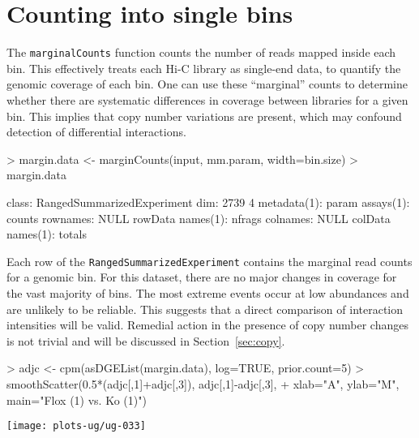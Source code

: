 \documentclass[12pt]{report}
\renewenvironment{Schunk}{\vspace{0pt}}{\vspace{0pt}}
\newcommand{\code}[1]{{\small\texttt{#1}}}
\begin{document}
\section{Counting into single bins}
\label{sec:marginal}
The \code{marginalCounts} function counts the number of reads mapped inside each bin.
This effectively treats each Hi-C library as single-end data, to quantify the genomic coverage of each bin.
One can use these ``marginal'' counts to determine whether there are systematic differences in coverage between libraries for a given bin.
This implies that copy number variations are present, which may confound detection of differential interactions.

\begin{Schunk}
\begin{Sinput}
> margin.data <- marginCounts(input, mm.param, width=bin.size)
> margin.data
\end{Sinput}
\begin{Soutput}
class: RangedSummarizedExperiment 
dim: 2739 4 
metadata(1): param
assays(1): counts
rownames: NULL
rowData names(1): nfrags
colnames: NULL
colData names(1): totals
\end{Soutput}
\end{Schunk}

Each row of the \code{RangedSummarizedExperiment} contains the marginal read counts for a genomic bin.
For this dataset, there are no major changes in coverage for the vast majority of bins.
The most extreme events occur at low abundances and are unlikely to be reliable.
This suggests that a direct comparison of interaction intensities will be valid.
Remedial action in the presence of copy number changes is not trivial and will be discussed in Section~\ref{sec:copy}.

\begin{Schunk}
\begin{Sinput}
> adjc <- cpm(asDGEList(margin.data), log=TRUE, prior.count=5)
> smoothScatter(0.5*(adjc[,1]+adjc[,3]), adjc[,1]-adjc[,3],
+     xlab="A", ylab="M", main="Flox (1) vs. Ko (1)")
\end{Sinput}
\end{Schunk}

\begin{center}
\texttt{[image: plots-ug/ug-033]}
\end{center}

% 
\end{document}
